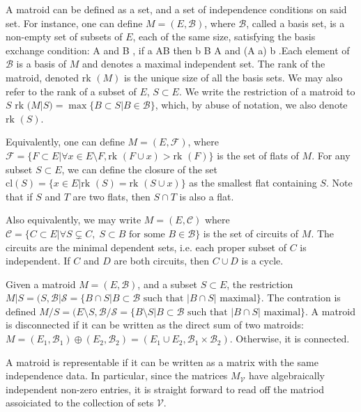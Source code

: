\documentclass[11pt]{article}
\newcommand{\rk}{\textrm{rk }}
\def\bas #1\eas{\begin{align*} #1 \end{align*}}
\newcommand{\cV}{\mathcal{V}}
\newcommand{\cB}{\mathcal{B}}
\theoremstyle{remark}
\theoremstyle{definition}
\begin{document}
A matroid can be defined as a set, and a set of independence conditions on said set. For instance, one can define $M = (E, \mathcal{B})$, where $\mathcal{B}$, called a basis set, is a non-empty set of subsets of $E$, each of the same size, satisfying the basis exchange condition: \bas \textrm{for  all } A \textrm{ and } B \in \cB, \textrm{ if }  a \in A\setminus B \textrm{ then } \exists b \in B \setminus A \textrm{ and } (A \setminus a) \cup b \in  \cB \;.\eas Each element of $$ is a basis of $M$ and denotes a maximal independent set. The rank of the matroid, denoted $\rk(M)$ is the unique size of all the basis sets. We may also refer to the rank of a subset of $E$, $S \subset E$. We write the restriction of a matroid to $S$ $\rk(M|S) = \max \{B \subset S| B \in \mathcal{B} \}$, which, by abuse of notation, we also denote $\rk(S)$. 

Equivalently, one can define $M = (E, \mathcal{F})$, where $\mathcal{F} = \{ F \subset E| \forall x \in E \setminus F, \rk(F \cup x) > \rk(F)\}$ is the set of flats of $M$. For any subset $S \subset E$, we can define the closure of the set $\textrm{cl}(S)  = \{x \in E | \rk(S) = \rk(S \cup x)\}$ as the smallest flat containing $S$. Note that if $S$ and $T$ are two flats, then $S \cap T$ is also a flat. 

Also equivalently, we may write $M = (E, \mathcal{C})$ where $\mathcal{C} = \{C \subset E | \forall S \subsetneq C, \; S \subset B \textrm{ for some } B \in \mathcal{B}\}$ is the set of circuits of $M$. The circuits are the minimal dependent sets, i.e. each proper subset of $C$ is independent. If $C$ and $D$ are both circuits, then $C \cup D$ is a cycle. 

Given a matroid $M = (E, \mathcal{B})$, and a subset $S \subset E$, the restriction $M|S = (S, \mathcal{B|S} = \{B\cap S| B \subset \mathcal{B} \textrm{ such that } |B \cap S| \textrm{ maximal} \}$. The contration is defined $M/S = (E \setminus S, \mathcal{B/S} = \{B\setminus S| B \subset \mathcal{B} \textrm{ such that } |B \cap S| \textrm{ maximal}\}$. A matroid is disconnected if it can be written as the direct sum of two matroids: $M = (E_1, \mathcal{B}_1) \oplus (E_2, \mathcal{B}_2)  = (E_1 \cup E_2 , \mathcal{B}_1 \times \mathcal{B}_2)$. Otherwise, it is connected.

A matroid is representable if it can be written as a matrix with the same independence data. In particular, since the matrices $M_\cV$ have algebraically independent non-zero entries, it is straight forward to read off the matriod assoiciated to the collection of sets $\cV$.
\end{document}
